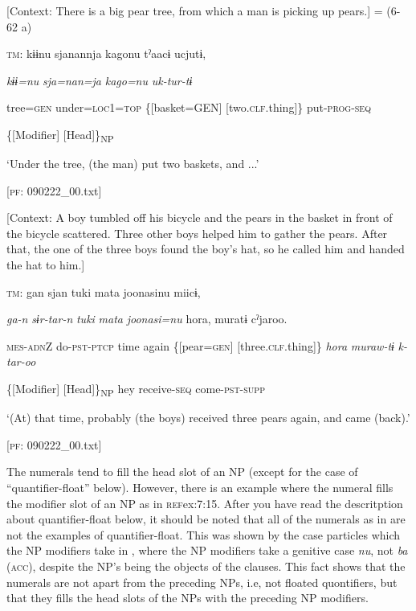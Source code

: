 \ex \label{ex:7:12b}[Context: There is a big pear tree, from which a man is picking up pears.] = (6-62 a)

    \textsc{tm}:  kɨɨnu  sjanannja  kagonu  tˀaacɨ  ucjutɨ,

      \textit{kɨɨ=nu}  \textit{sja=nan=ja}  \textit{kago=nu}  \textit{}  \textit{uk-tur-tɨ}
                                                                              
      tree=\textsc{gen}  under=\textsc{loc}1=\textsc{top}  \{[basket=GEN]  [two.\textsc{clf}.thing]\}   put-\textsc{prog}-\textsc{seq}
                                                                              
          \{[Modifier]  [Head]\}\textsubscript{NP}

      ‘Under the tree, (the man) put two baskets, and ...’

      [\textsc{pf}: 090222\_00.txt]

\ex \label{ex:7:12c}[Context: A boy tumbled off his bicycle and the pears in the basket in front of the bicycle scattered. Three other boys helped him to gather the pears. After that, the one of the three boys found the boy’s hat, so he called him and handed the hat to him.]

    \textsc{tm}:  gan  sjan  tuki  mata  joonasinu  miicɨ,

      \textit{ga-n}  \textit{sɨr-tar-n}  \textit{tuki}  \textit{mata}  \textit{joonasi=nu}  \textit{} {\textbar}hora{\textbar},  muratɨ  cˀjaroo.
                                                                                                          
      \textsc{mes}-\textsc{adn}Z  do-\textsc{pst}-\textsc{ptcp}  time  again  \{[pear=\textsc{gen}]  [three.\textsc{clf}.thing]\}    \textit{hora}  \textit{muraw-tɨ}  \textit{k-tar-oo}
                                                                                                          
              \{[Modifier]  [Head]\}\textsubscript{NP}    hey  receive-\textsc{seq}  come-\textsc{pst}-\textsc{supp}

      ‘(At) that time, probably (the boys) received three pears again, and came (back).’

      [\textsc{pf}: 090222\_00.txt]
    \z
\z

The numerals tend to fill the head slot of an NP (except for the case of “quantifier-float” below). However, there is an example where the numeral fills the modifier slot of an NP as in \textsc{ref}{ex:7:15}. After you have read the descritption about quantifier-float below, it should be noted that all of the numerals as in  are not the examples of quantifier-float. This was shown by the case particles which the NP modifiers take in , where the NP modifiers take a genitive case \textit{nu}, not \textit{ba} (\textsc{acc}), despite the NP’s being the objects of the clauses. This fact shows that the numerals are not apart from the preceding NPs, i.e, not floated quontifiers, but that they fills the head slots of the NPs with the preceding NP modifiers.

